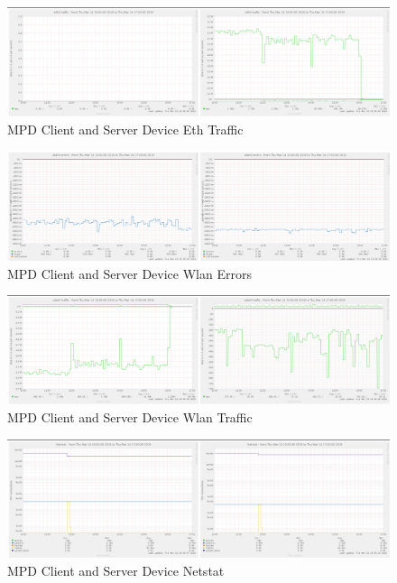 \documentclass[11pt,a4paper,headinclude=false,footinclude=false]{scrreprt}
\begin{document}
\begin{figure}[H]
\includegraphics{ResultsAndAnalysis/MPDServerTestImages/010MPDEth0Traffic.png}
\centering
\caption{MPD Client and Server Device Eth Traffic}
\label{MPDEthTraffic}
\end{figure}

\begin{figure}[H]
\includegraphics{ResultsAndAnalysis/MPDServerTestImages/020MPDWlan0Errors.png}
\centering
\caption{MPD Client and Server Device Wlan Errors}
\label{MPDWlanError}
\end{figure}

\begin{figure}[H]
\includegraphics{ResultsAndAnalysis/MPDServerTestImages/021MPDWlan0Traffic.png}
\centering
\caption{MPD Client and Server Device Wlan Traffic}
\label{MPDWlanTraffic}
\end{figure}

\begin{figure}[H]
\includegraphics{ResultsAndAnalysis/MPDServerTestImages/017MPDNetstat.png}
\centering
\caption{MPD Client and Server Device Netstat}
\label{MPDNetstat}
\end{figure}
\end{document}
